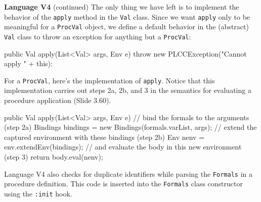 \begin{minipage}[t]{\sw}
\slidenumber
\LARGE
{\bf Language V4} (continued)\exx
The only thing we have left is to implement
the behavior of the \verb'apply' method in the \verb'Val' class.
Since we want \verb'apply' only to be meaningful for a \verb'ProcVal' object,
we define a default behavior in the (abstract) \verb'Val' class
to throw an exception for anything but a \verb'ProcVal':
{\Large
\begin{qv}
public Val apply(List<Val> args, Env e) {
    throw new PLCCException("Cannot apply " + this): 
}
\end{qv}
}
For a \verb'ProcVal', here's the implementation of \verb'apply'.
Notice that this implementation carries out steps 2a, 2b, and 3
in the semantics for evaluating a procedure application (Slide 3.60).
{\Large
\begin{qv}
public Val apply(List<Val> args, Env e) {
    // bind the formals to the arguments (step 2a)
    Bindings bindings = new Bindings(formals.varList, args);
    // extend the captured environment with these bindings (step 2b)
    Env nenv = env.extendEnv(bindings);
    // and evaluate the body in this new environment (step 3)
    return body.eval(nenv);
}
\end{qv}
}
Language V4 also checks for duplicate identifiers
while parsing the \verb'Formals' in a procedure definition.
This code is inserted into the \verb'Formals' class constructor
using the \verb':init' hook.
\end{minipage}
\clearpage
